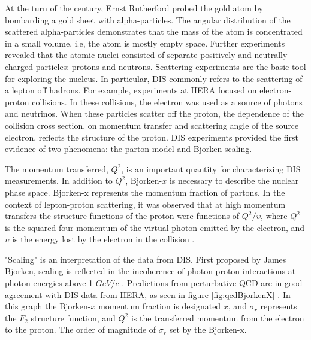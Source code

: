 At the turn of the century, Ernst Rutherford probed the gold atom by bombarding a gold sheet with alpha-particles. The angular distribution of the scattered alpha-particles demonstrates that the mass of the atom is concentrated in a small volume, i.e, the atom is mostly empty space. Further experiments revealed that the atomic nuclei consisted of separate positively and neutrally charged particles: protons and neutrons. Scattering experiments are the basic tool for exploring the nucleus. In particular, DIS commonly refers to the scattering of a lepton off hadrons. For example, experiments at HERA focused on electron-proton collisions. In these collisions, the electron was used as a source of photons and neutrinos. When these particles scatter off the proton, the dependence of the collision cross section, on momentum transfer and scattering angle of the source electron, reflects the structure of the proton. DIS experiments provided the first evidence of two phenomena: the parton model and Bjorken-scaling. 

The momentum transferred, $Q^2$, is an important quantity for characterizing DIS measurements. In addition to $Q^2$, Bjorken-$x$ is necessary to describe the nuclear phase space. Bjorken-x represents the momentum fraction of partons. In the context of lepton-proton scattering, it was observed that at high momentum transfers the structure functions of the proton were functions of $Q^2/\upsilon$, where $Q^2$ is the squared four-momentum of the virtual photon emitted by the electron, and $\upsilon$ is the energy lost by the electron in the collision \cite{Bjorken:1968dy}. 

"Scaling" is an interpretation of the data from DIS. First proposed by James Bjorken, scaling is reflected in the incoherence of photon-proton interactions at photon energies above 1 $GeV/c$ \cite{Bjorken:1982qr}. Predictions from perturbative QCD are in good agreement with DIS data from HERA, as seen in figure \ref{fig:qcdBjorkenX} \cite{Shimizu:2009fc}. In this graph the Bjorken-$x$ momentum fraction is designated $x$, and $\sigma_r$ represents the $F_2$ structure function, and $Q^2$ is the transferred momentum from the electron to the proton. The order of magnitude of $\sigma_r$ set by the Bjorken-x.

